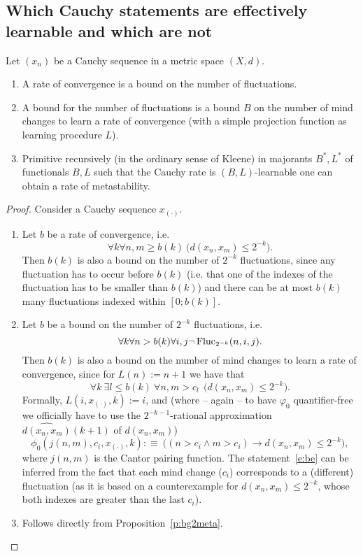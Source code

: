 \subsection{Which Cauchy statements are effectively learnable and which are not}
\begin{prop} \label{prop.hierarchy}
Let $(x_n)$ be a Cauchy sequence in a metric space $(X,d).$ 
\begin{enumerate}
\item A rate of convergence is a bound on the number of fluctuations.
\item A bound for the number of fluctuations is a bound $B$ 
on the number of mind changes to learn a rate of convergence (with a  
simple projection function as learning procedure $L$).
\item 
Primitive recursively (in the ordinary sense of Kleene) in majorants 
$B^*,L^*$ of functionals $B,L$ such that the Cauchy rate is $(B,L)$-learnable 
one can obtain a rate of metastability. 
\end{enumerate}
\end{prop}
\begin{proof}
Consider a Cauchy sequence $x_{(\cdot)}$.
\begin{enumerate}
\item Let $b$ be a rate of convergence, i.e.
\[ \forall k \forall n,m\geq b(k)\ \big( d(x_n,x_m)\leq 2^{-k}\big). \]
Then $b(k)$ is also a bound on the number of $2^{-k}$ fluctuations, since any fluctuation has to occur before $b(k)$ (i.e. that one of the indexes of the 
fluctuation has to be smaller than $b(k)$) and there can be at most $b(k)$ many fluctuations indexed within $[0;b(k)]$.
\item Let $b$ be a bound on the number of $2^{-k}$ fluctuations, i.e.
\[ \forall k \forall n>b(k) \forall i,j \neg\operatorname{Fluc}_{2^{-k}}(n,i,j). \]
Then $b(k)$ is also a bound on the number of mind changes to learn a rate of convergence, since for 
$L(n):=n+1$ we have that
\[ \forall k\ \exists l\leq b(k)\ \forall n,m>c_l\ \ \big(  d(x_n,x_m)\leq 2^{-k}\big). \tag{BE}\label{e:be}\]
%
Formally, $L(i,x_{(\cdot)},k):=i$, and (where -- again -- to have 
$\varphi_0$ quantifier-free we officially have to use the $2^{-k-1}$-rational 
approximation $\widehat{d(x_n,x_m)}(k+1)$ of $d(x_n,x_m)$) 
\[
\phi_0(j(n,m),c_i,x_{(\cdot)},k):\equiv\ \big((n>c_i \wedge m>c_i) \rightarrow d(x_n,x_m)\leq 2^{-k}\big),
\]
where $j(n,m)$ is the Cantor pairing function.
%
The statement~\eqref{e:be} can be inferred from the fact that each mind change ($c_i$) corresponds to a (different) fluctuation (as it is based on a counterexample for $d(x_n,x_m)\leq 2^{-k}$, whose both indexes are greater than the last $c_i$).
\item Follows directly from Proposition~\ref{p:bg2meta}.
\end{enumerate}
\end{proof}

